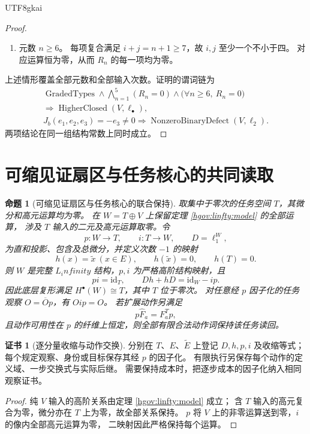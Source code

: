 \documentclass[12pt,a4paper,openany,notitlepage]{report}
\theoremstyle{plain}
\newtheorem{proposition}[theorem]{命题}
\theoremstyle{definition}
\newtheorem*{certificate}{证书}
\theoremstyle{remark}
\def\mathcal#1{#1}\def\mathsf#1{#1}\def\mathbb#1{#1}%
\def\infty{infinity}\def\Gamma{Gamma}\def\Phi{Phi}%
\begin{document}
\begin{CJK*}{UTF8}{gkai}
\begin{proof}
\begin{enumerate}
\item 元数 $n\ge6$。
每项复合满足 $i+j=n+1\ge7$，故 $i,j$ 至少一个不小于四。
对应运算恒为零，从而 $\mathcal R_n$ 的每一项均为零。
\end{enumerate}
上述情形覆盖全部元数和全部输入次数。证明的谓词链为
\[
\begin{gathered}
\operatorname{GradedTypes}\land
\bigwedge_{n=1}^{5}(\mathcal R_n=0)
\land
\bigl(\forall n\ge6,\ \mathcal R_n=0\bigr)\\
\Rightarrow\operatorname{HigherClosed}(V,\ell_\bullet),\\
J_b(e_1,e_2,e_3)=-e_3\ne0
\Rightarrow\operatorname{NonzeroBinaryDefect}(V,\ell_2).
\end{gathered}
\]
两项结论在同一组结构常数上同时成立。
\end{proof}

\section{可缩见证扇区与任务核心的共同读取}

\begin{proposition}[可缩见证扇区与任务核心的联合保持]
\label{hgov:linfty:task}
取集中于零次的任务空间 $T$，其微分和高元运算均为零。
在 $W=T\oplus V$ 上保留定理 \ref{hgov:linfty:model} 的全部运算，
涉及 $T$ 输入的二元及高元运算取零。令
\[
p:W\to T,\qquad i:T\to W,\qquad D=\ell_1^W,
\]
为直和投影、包含及总微分，并定义次数 $-1$ 的映射
\[
h(x)=\widetilde x\ (x\in E),\qquad
h(\widetilde x)=0,\qquad h(T)=0.
\]
则 $W$ 是完整 $L_\infty$ 结构，$p,i$ 为严格高阶结构映射，且
\[
pi=\mathrm{id}_T,\qquad
Dh+hD=\mathrm{id}_W-ip.
\]
因此底层复形满足 $H^\bullet(W)\cong T$，其中 $T$ 位于零次。
对任意经 $p$ 因子化的任务观察 $O=\overline O p$，有 $Oip=O$。
若扩展动作另满足
\[
p\widehat F_a=F_a^Tp,
\]
且动作可用性在 $p$ 的纤维上恒定，则全部有限合法动作词保持该任务读回。
\end{proposition}

\begin{certificate}[逐分量收缩与动作交换]
\label{hgov:linfty:task-certificate}
分别在 $T$、$E$、$\widetilde E$ 上登记 $D,h,p,i$ 及收缩等式；
每个规定观察、身份或目标保存其经 $p$ 的因子化。
有限执行另保存每个动作的定义域、一步交换式与实际后继。
需要保持成本时，把逐步成本的因子化纳入相同观察证书。
\end{certificate}

\begin{proof}
纯 $V$ 输入的高阶关系由定理 \ref{hgov:linfty:model} 成立；
含 $T$ 输入的高元复合为零，微分亦在 $T$ 上为零，故全部关系保持。
$p$ 将 $V$ 上的非零运算送到零，$i$ 的像内全部高元运算为零，
二映射因此严格保持每个运算。


\end{proof}
\end{CJK*}
\end{document}
